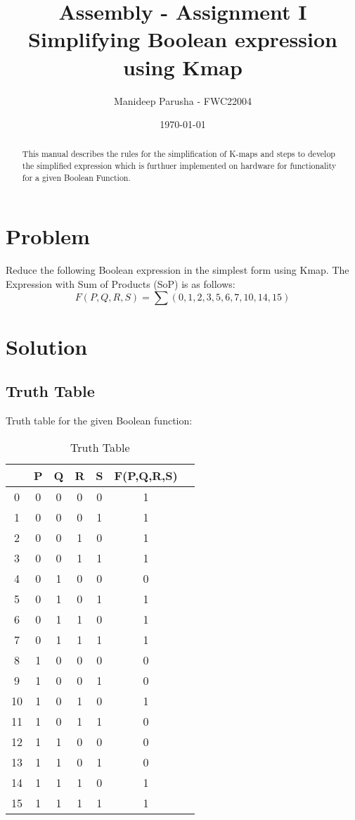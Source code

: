 \documentclass[journal,12pt,twocolumn]{IEEEtran}
\title{Assembly - Assignment \textrm{I} \textbf{\\Simplifying Boolean expression using Kmap}}
\author{Manideep Parusha - FWC22004}
\date{\today}
\begin{document}
\maketitle

\tableofcontents 
\bigskip
\begin{abstract}
This manual describes the rules for the simplification of K-maps and steps to develop the simplified expression which is furthuer implemented on hardware for functionality for a given Boolean Function. 
\end{abstract}
\section{Problem}
Reduce the following Boolean expression in the simplest form using Kmap. The Expression with Sum of Products (SoP) is as follows:
$$ {F(P,Q,R,S) = \sum (0,1,2,3,5,6,7,10,14,15)}$$

\newpage
\section{Solution}

\subsection{Truth Table}
Truth table for the given Boolean function:
\begin{table}[h]
    \centering
    \begin{tabular}[20pt]{|c|c|c|c|c||c|c|}
          \hline
          &P&Q&R&S&F(P,Q,R,S) \\
          \hline
          0&0&0&0&0&1\\
          1&0&0&0&1&1\\
          2&0&0&1&0&1\\
          3&0&0&1&1&1\\
          4&0&1&0&0&0\\
          5&0&1&0&1&1\\
          6&0&1&1&0&1\\
          7&0&1&1&1&1\\
          8&1&0&0&0&0\\
          9&1&0&0&1&0\\
          10&1&0&1&0&1\\
          11&1&0&1&1&0\\
          12&1&1&0&0&0\\
          13&1&1&0&1&0\\
          14&1&1&1&0&1\\
          15&1&1&1&1&1\\   
          \hline 
              \end{tabular}
              \bigskip
    \caption{Truth Table}
    \label{Truthtable}
\end{table}
\end{document}

